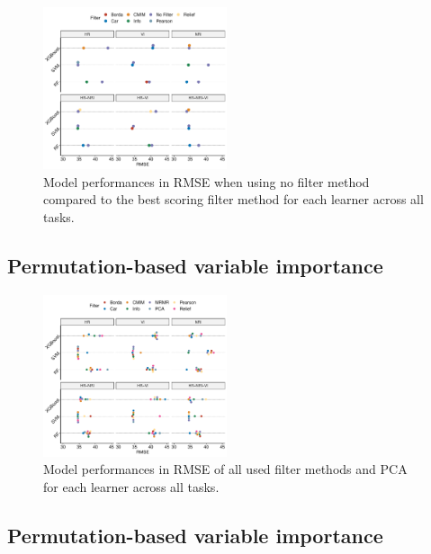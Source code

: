\documentclass[letterpaper, peerreview]{IEEEtran}
\begin{document}
\begin{figure} [t!]
	\centering
	\begin{center}
		\includegraphics[width=0.48\textwidth] {filter-effect-1.pdf}
		\caption{Model performances in RMSE when using no filter method compared to the best scoring filter method for each learner across all tasks.}\label{fig:filter-effects}
	\end{center}
\end{figure}
\subsection{Permutation-based variable importance}

\begin{figure} [t!]
	\centering
	\begin{center}
		\includegraphics[width=0.48\textwidth] {filter-perf-all-1.pdf}
		\caption{Model performances in RMSE of all used filter methods and PCA for each learner across all tasks.}\label{fig:filter-perf-all}
	\end{center}
\end{figure}


\subsection{Permutation-based variable importance}
\end{document}
